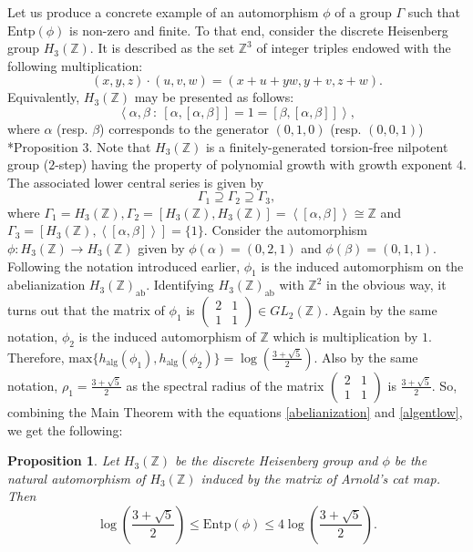 \documentclass[a4paper,11pt,reqno]{amsart}
\theoremstyle{plain}
\newtheorem{prop}[thm]{Proposition}
\theoremstyle{mainthmstyle}
\theoremstyle{named}
\numberwithin{equation}{section}
\begin{document}
Let us produce a concrete example of an automorphism $\phi$ of a group $\Gamma$ such that $\mathrm{Entp}(\phi)$ is non-zero and finite. To that end, consider the discrete Heisenberg group $H_3 (\mathbb Z).$ It is described as the set $\mathbb Z^{3}$ of integer triples endowed with the following multiplication$:$
$$(x, y, z) \cdot (u, v, w) = (x + u + y w, y + v, z + w).$$ Equivalently, $H_3 (\mathbb Z)$ may be presented as follows$:$
$$\left \langle \alpha, \beta\ :\ [\alpha, [\alpha, \beta]] = 1 = [\beta, [\alpha, \beta]] \right \rangle,$$ where $\alpha$ (resp. $\beta$) corresponds to the generator $(0, 1, 0)$ (resp. $(0, 0, 1)$) \cite{Kahn}*{Proposition 3}. Note that $H_3 (\mathbb Z)$ is a finitely-generated torsion-free nilpotent group ($2$-step) having the property of polynomial growth with growth exponent $4.$ The associated lower central series is given by $$\Gamma_1 \supseteq \Gamma_2 \supseteq \Gamma_3,$$ where $\Gamma_1 = H_3 (\mathbb Z), \Gamma_2 = \left [H_3 (\mathbb Z), H_3 (\mathbb Z) \right ] = \left \langle [\alpha, \beta] \right \rangle \cong \mathbb Z$ and $\Gamma_3 = \left [H_3 (\mathbb Z), \left \langle [\alpha, \beta] \right \rangle \right ] = \{1\}.$ Consider the automorphism $\phi : H_3 (\mathbb Z) \rightarrow H_3 (\mathbb Z)$ given by $\phi (\alpha) = (0, 2, 1)$ and $\phi (\beta) = (0, 1, 1).$ Following the notation introduced earlier, $\phi_1$ is the induced automorphism on the abelianization $H_3 (\mathbb Z)_{\mathrm {ab}}.$ Identifying $H_3 (\mathbb Z)_{\mathrm {ab}}$ with $\mathbb Z^{2}$ in the obvious way, it turns out that the matrix of $\phi_1$ is $\begin{pmatrix} 2 & 1 \\ 1 & 1 \end{pmatrix} \in GL_2 (\mathbb Z).$ Again by the same notation, $\phi_{2}$ is the induced automorphism of $\mathbb{Z}$ which is multiplication by $1$. Therefore, $\mathrm{max}\{h_{\mathrm{alg}}(\phi_1),h_{\mathrm{alg}}(\phi_2)\}= \log \left (\frac{3+\sqrt{5}}{2} \right )$. Also by the same notation, $\rho_1=\frac{3+\sqrt{5}}{2}$ as the spectral radius of the matrix $\begin{pmatrix} 2 & 1 \\ 1 & 1 \end{pmatrix}$ is $\frac {3 + \sqrt {5}} {2}$. So, combining the Main Theorem with the equations \eqref{abelianization} and \eqref{algentlow}, we get the following:
\begin{prop}
    Let $H_3 (\mathbb Z)$ be the discrete Heisenberg group and $\phi$ be the natural automorphism of $H_3 (\mathbb Z)$ induced by the matrix of Arnold's cat map. Then
    \begin{displaymath}
     \log \left (\frac {3 + \sqrt {5}} {2} \right ) \leq \mathrm {Entp} (\phi) \leq 4 \log \left (\frac {3 + \sqrt {5}} {2} \right ).   
    \end{displaymath}
\end{prop}
 
\end{document}
